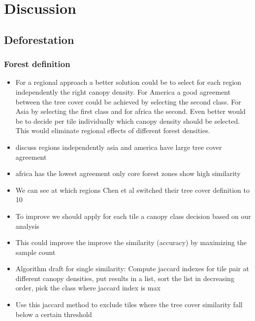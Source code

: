 \chapter{Discussion}
\label{ch:discussion}
	\section{Deforestation}
	\label{sec:discussion_deforestation}

		\subsection{Forest definition}
		\label{subsec:discussion_forest_definition}
			\begin{itemize}
				\item For a regional approach a better solution could be to select for each region independently the right canopy density. For America a good agreement between the tree cover could be achieved by selecting the second class. For Asia by selecting the first class and for africa the second. Even better would be to decide per tile individually which canopy density should be selected. This would eliminate regional effects of different forest densities.
				\item discuss regions independently asia and america have large tree cover agreement
				\item africa has the lowest agreement only core forest zones show high similarity
				\item We can see at which regions Chen et al switched their tree cover definition to 10
				\item To improve we should apply for each tile a canopy class decision based on our analysis
				\item This could improve the improve the similarity (accuracy) by maximizing the sample count
				\item Algorithm draft for single similarity: Compute jaccard indexes for tile pair at different canopy densities, put results in a list, sort the list in decreasing order, pick the class where jaccard index is max
				\item Use this jaccard method to exclude tiles where the tree cover similarity fall below a certain threshold
			\end{itemize}

